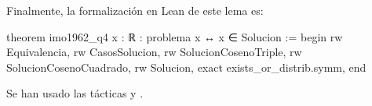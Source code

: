 Finalmente, la formalización en Lean de este lema es:
\begin{leancode}
theorem imo1962_q4
  {x : ℝ}
  : problema x ↔ x ∈ Solucion :=
begin
  rw Equivalencia,
  rw CasosSolucion,
  rw SolucionCosenoTriple,
  rw SolucionCosenoCuadrado,
  rw Solucion,
  exact exists_or_distrib.symm,
end
\end{leancode}

Se han usado las tácticas
 y
.
